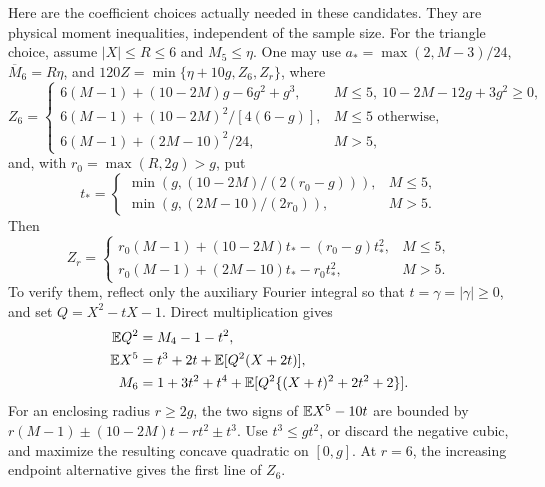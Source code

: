 Here are the coefficient choices actually needed in these candidates.
They are physical moment inequalities, independent of the sample size.
For the triangle choice, assume $|X|\le R\le6$ and $M_5\le\eta$.
One may use $a_* =\max(2,M-3)/24$, $\overline M_6=R\eta$, and
$120Z=\min\{\eta+10g,Z_6,Z_r\}$, where
\[
 Z_6=\begin{cases}
 6(M-1)+(10-2M)g-6g^2+g^3,
       &M\le5,\ 10-2M-12g+3g^2\ge0,\\
 6(M-1)+(10-2M)^2/[4(6-g)],&M\le5\text{ otherwise},\\
 6(M-1)+(2M-10)^2/24,&M>5,
 \end{cases}
\]
and, with $r_0=\max(R,2g)>g$, put
\[
 t_*=\begin{cases}
 \min(g,(10-2M)/(2(r_0-g))),&M\le5,\\
 \min(g,(2M-10)/(2r_0)),&M>5.
 \end{cases}
\]
Then
\[
 Z_r=\begin{cases}
 r_0(M-1)+(10-2M)t_*-(r_0-g)t_*^2,&M\le5,\\
 r_0(M-1)+(2M-10)t_*-r_0t_*^2,&M>5.
 \end{cases}
\]
To verify them, reflect only the auxiliary Fourier integral so that
$t=\gamma=|\gamma|\ge0$, and set $Q=X^2-tX-1$.
Direct multiplication gives
\begin{equation}\label{ut:pearson}
\begin{aligned}
 \mathbb E Q^2&=M_4-1-t^2,\\
 \mathbb E X^5&=t^3+2t+\mathbb E[Q^2(X+2t)],\\
 M_6&=1+3t^2+t^4+\mathbb E[Q^2\{(X+t)^2+2t^2+2\}].
\end{aligned}
\end{equation}
For an enclosing radius $r\ge2g$, the two signs of
$\mathbb E X^5-10t$ are bounded by
$r(M-1)\pm(10-2M)t-rt^2\pm t^3$.
Use $t^3\le gt^2$, or discard the negative cubic, and maximize the
resulting concave quadratic on $[0,g]$. At $r=6$, the increasing
endpoint alternative gives the first line of $Z_6$.

